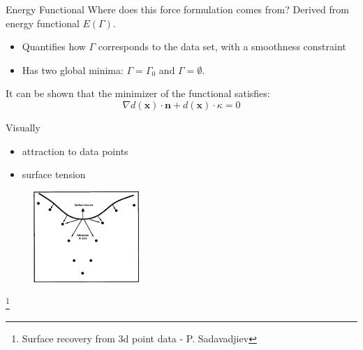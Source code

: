 \documentclass{beamer}
\begin{document}
\begin{frame}{Energy Functional}
Where does this force formulation comes from? Derived from energy functional $E(\Gamma)$.
\begin{itemize}
\item Quantifies how $\Gamma$ corresponds to the data set, with a smoothness constraint
\item Has two global minima: $\Gamma = \Gamma_0$  and $\Gamma = \emptyset$.
\end{itemize}
It can be shown that the minimizer of the functional satisfies:
\[
\nabla d(\mathbf{x}) \cdot \mathbf{n} + d(\mathbf{x}) \cdot \kappa = 0
\]
\end{frame}
\begin{frame}{Visually}
\begin{itemize}
\item attraction to data points
\item surface tension
\end{itemize}
\begin{figure}[H]
\centering
\includegraphics[width=40mm]{img/savadjiev3_3.png}
\end{figure}\footnote{Surface recovery from 3d point data - P. Sadavadjiev}
\end{frame}

\end{document}

